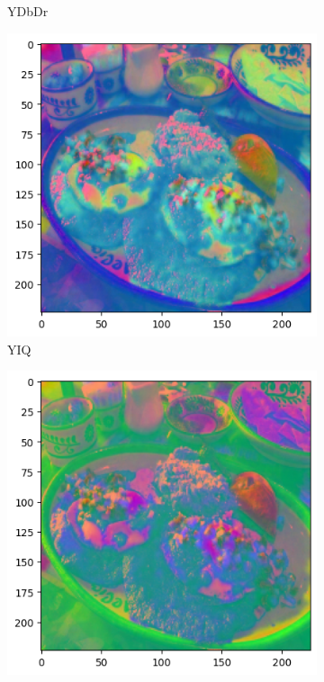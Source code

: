 \begin{figure}[htbp]
\begin{subfigure}[b]{0.22\textwidth}
    \caption{YDbDr}
    \label{fig:ydbdr}
  \end{subfigure}
  \hfill
  \medskip
  \begin{subfigure}[b]{0.22\textwidth}
    \includegraphics[width=\textwidth]{graphics/images/colorspaces/yiq.png}
    \caption{YIQ}
    \label{fig:yiq}
  \end{subfigure}
  \hfill
  \begin{subfigure}[b]{0.22\textwidth}
    \includegraphics[width=\textwidth]{graphics/images/colorspaces/ypbpr.png}

\end{subfigure}
\end{figure}
